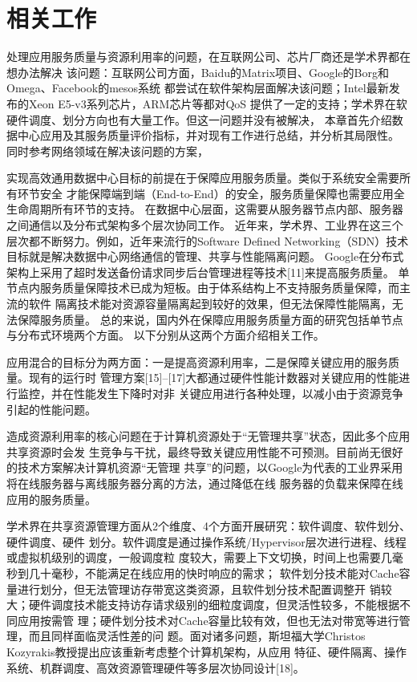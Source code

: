 \section{相关工作}

处理应用服务质量与资源利用率的问题，在互联网公司、芯片厂商还是学术界都在想办法解决
该问题：互联网公司方面，Baidu的Matrix项目、Google的Borg和Omega、Facebook的mesos系统
都尝试在软件架构层面解决该问题；Intel最新发布的Xeon E5-v3系列芯片，ARM芯片等都对QoS
提供了一定的支持；学术界在软硬件调度、划分方向也有大量工作。但这一问题并没有被解决，
本章首先介绍数据中心应用及其服务质量评价指标，并对现有工作进行总结，并分析其局限性。
同时参考网络领域在解决该问题的方案，

实现高效通用数据中心目标的前提在于保障应用服务质量。类似于系统安全需要所有环节安全
才能保障端到端（End-to-End）的安全，服务质量保障也需要应用全生命周期所有环节的支持。
在数据中心层面，这需要从服务器节点内部、服务器之间通信以及分布式架构多个层次协同工作。
近年来，学术界、工业界在这三个层次都不断努力。例如，近年来流行的Software Defined
Networking（SDN）技术\cite{SDN}目标就是解决数据中心网络通信的管理、共享与性能隔离问题。
Google在分布式架构上采用了超时发送备份请求同步后台管理进程等技术[11]来提高服务质量。
单节点内服务质量保障技术已成为短板。由于体系结构上不支持服务质量保障，而主流的软件
隔离技术能对资源容量隔离起到较好的效果，但无法保障性能隔离，无法保障服务质量。
总的来说，国内外在保障应用服务质量方面的研究包括单节点与分布式环境两个方面。
以下分别从这两个方面介绍相关工作。


应用混合的目标分为两方面：一是提高资源利用率，二是保障关键应用的服务质量。现有的运行时
管理方案[15]–[17]大都通过硬件性能计数器对关键应用的性能进行监控，并在性能发生下降时对非
关键应用进行各种处理，以减小由于资源竞争引起的性能问题。

造成资源利用率的核心问题在于计算机资源处于“无管理共享”状态，因此多个应用共享资源时会发
生竞争与干扰，最终导致关键应用性能不可预测。目前尚无很好的技术方案解决计算机资源“无管理
共享”的问题，以Google为代表的工业界采用将在线服务器与离线服务器分离的方法，通过降低在线
服务器的负载来保障在线应用的服务质量。

学术界在共享资源管理方面从2个维度、4个方面开展研究：软件调度、软件划分、硬件调度、硬件
划分。软件调度是通过操作系统/Hypervisor层次进行进程、线程或虚拟机级别的调度，一般调度粒
度较大，需要上下文切换，时间上也需要几毫秒到几十毫秒，不能满足在线应用的快时响应的需求；
软件划分技术能对Cache容量进行划分，但无法管理访存带宽这类资源，且软件划分技术配置调整开
销较大；硬件调度技术能支持访存请求级别的细粒度调度，但灵活性较多，不能根据不同应用按需管
理；硬件划分技术对Cache容量比较有效，但也无法对带宽等进行管理，而且同样面临灵活性差的问
题。面对诸多问题，斯坦福大学Christos Kozyrakis教授提出应该重新考虑整个计算机架构，从应用
特征、硬件隔离、操作系统、机群调度、高效资源管理硬件等多层次协同设计[18]。

